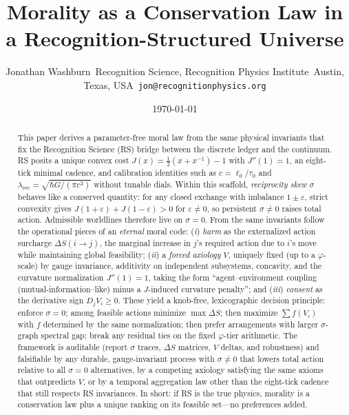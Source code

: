 \documentclass[11pt]{article}
\title{Morality as a Conservation Law in a Recognition-Structured Universe}
\author{Jonathan Washburn\
Recognition Science, Recognition Physics Institute\
Austin, Texas, USA\
\texttt{jon@recognitionphysics.org}}
\date{\today}
\begin{document}
\maketitle

\begin{abstract}
This paper derives a parameter-free moral law from the same physical invariants that fix the Recognition Science (RS) bridge between the discrete ledger and the continuum. RS posits a unique convex cost \(J(x)=\tfrac12(x+x^{-1})-1\) with \(J''(1)=1\), an eight-tick minimal cadence, and calibration identities such as \(c=\ell_0/\tau_0\) and \(\lambda_{\mathrm{rec}}=\sqrt{\hbar G/(\pi c^3)}\) without tunable dials. Within this scaffold, \emph{reciprocity skew} \(\sigma\) behaves like a conserved quantity: for any closed exchange with imbalance \(1\pm \varepsilon\), strict convexity gives \(J(1+\varepsilon)+J(1-\varepsilon)>0\) for \(\varepsilon\neq 0\), so persistent \(\sigma\neq 0\) raises total action. Admissible worldlines therefore live on \(\sigma=0\). From the same invariants follow the operational pieces of an \emph{eternal} moral code: (\emph{i}) \emph{harm} as the externalized action surcharge \(\Delta S(i\!\to\!j)\), the marginal increase in \(j\)'s required action due to \(i\)'s move while maintaining global feasibility; (\emph{ii}) a \emph{forced axiology} \(V\), uniquely fixed (up to a \(\varphi\)-scale) by gauge invariance, additivity on independent subsystems, concavity, and the curvature normalization \(J''(1)=1\), taking the form “agent–environment coupling (mutual-information–like) minus a \(J\)-induced curvature penalty”; and (\emph{iii}) \emph{consent} as the derivative sign \(D_j V_i\ge 0\). These yield a knob-free, lexicographic decision principle: enforce \(\sigma=0\); among feasible actions minimize \(\max\Delta S\); then maximize \(\sum f(V_i)\) with \(f\) determined by the same normalization; then prefer arrangements with larger \(\sigma\)-graph spectral gap; break any residual ties on the fixed \(\varphi\)-tier arithmetic. The framework is auditable (report \(\sigma\) traces, \(\Delta S\) matrices, \(V\) deltas, and robustness) and falsifiable by any durable, gauge-invariant process with \(\sigma\neq 0\) that lowers total action relative to all \(\sigma=0\) alternatives, by a competing axiology satisfying the same axioms that outpredicts \(V\), or by a temporal aggregation law other than the eight-tick cadence that still respects RS invariances. In short: if RS is the true physics, morality is a conservation law plus a unique ranking on its feasible set—no preferences added.
\end{abstract}
\end{document}
